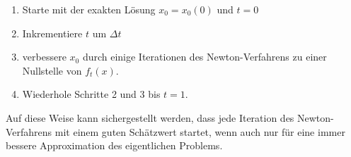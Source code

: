 \begin{enumerate}
\item 
Starte mit der exakten Lösung $x_0=x_0(0)$ und $t=0$
\item
Inkrementiere $t$ um $\Delta t$
\item
verbessere $x_0$ durch einige Iterationen des Newton-Verfahrens
zu einer Nullstelle von $f_t(x)$.
\item 
Wiederhole Schritte 2 und 3 bis $t=1$.
\end{enumerate}
%
Auf diese Weise kann sichergestellt werden, dass jede Iteration
des Newton-Verfahrens mit einem guten Schätzwert startet, wenn auch
nur für eine immer bessere Approximation des eigentlichen Problems.







